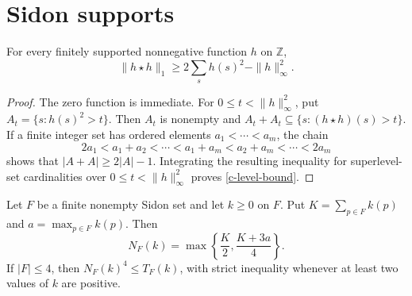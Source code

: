 \section{Sidon supports}
\label{sec:sidon}

\begin{lemma}\label{c-level-set}
For every finitely supported nonnegative function $h$ on $\mathbb Z$,
\begin{equation}\label{c-level-bound}
 \|h\star h\|_1\ge 2\sum_s h(s)^2-\|h\|_\infty^2.
\end{equation}
\end{lemma}

\begin{proof}
The zero function is immediate.  For $0\le t<\|h\|_\infty^2$, put
$A_t=\{s:h(s)^2>t\}$.  Then $A_t$ is nonempty and
$A_t+A_t\subseteq\{s:(h\star h)(s)>t\}$.  If a finite integer set has
ordered elements $a_1<\cdots<a_m$, the chain
\[
 2a_1<a_1+a_2<\cdots<a_1+a_m<a_2+a_m<\cdots<2a_m
\]
shows that $|A+A|\ge2|A|-1$.  Integrating the resulting inequality for
superlevel-set cardinalities over $0\le t<\|h\|_\infty^2$ proves
\eqref{c-level-bound}.
\end{proof}

\begin{proposition}\label{c-sidon}
Let $F$ be a finite nonempty Sidon set and let $k\ge0$ on $F$.  Put
$K=\sum_{p\in F}k(p)$ and $a=\max_{p\in F}k(p)$.  Then
\begin{equation}\label{c-sidon-norm}
 N_F(k)=\max\left\{\frac K2,\frac{K+3a}{4}\right\}.
\end{equation}
If $|F|\le4$, then $N_F(k)^4\le T_F(k)$, with strict inequality
whenever at least two values of $k$ are positive.
\end{proposition}

